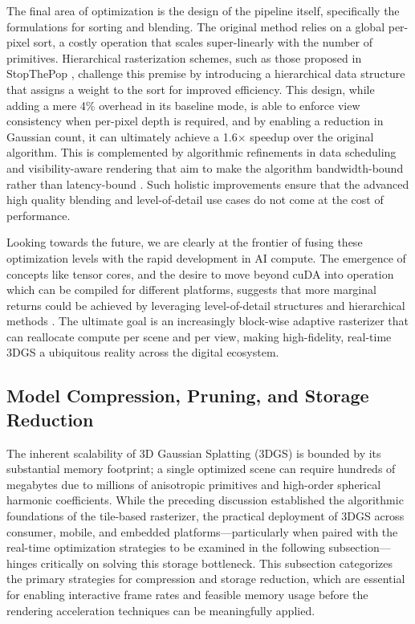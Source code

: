 \documentclass[11pt,a4paper]{article}
\begin{document}
The final area of optimization is the design of the pipeline itself, specifically the formulations for sorting and blending. The original method relies on a global per-pixel sort, a costly operation that scales super-linearly with the number of primitives. Hierarchical rasterization schemes, such as those proposed in StopThePop \cite{arxiv:2402.00525v1}, challenge this premise by introducing a hierarchical data structure that assigns a weight to the sort for improved efficiency. This design, while adding a mere 4\% overhead in its baseline mode, is able to enforce view consistency when per-pixel depth is required, and by enabling a reduction in Gaussian count, it can ultimately achieve a 1.6$\times$ speedup over the original algorithm. This is complemented by algorithmic refinements in data scheduling and visibility-aware rendering that aim to make the algorithm bandwidth-bound rather than latency-bound \cite{arxiv:2308.04079v1}. Such holistic improvements ensure that the advanced high quality blending and level-of-detail use cases do not come at the cost of performance.

Looking towards the future, we are clearly at the frontier of fusing these optimization levels with the rapid development in AI compute. The emergence of concepts like tensor cores, and the desire to move beyond cuDA into operation which can be compiled for different platforms, suggests that more marginal returns could be achieved by leveraging level-of-detail structures and hierarchical methods \cite{arxiv:2406.12080v1}. The ultimate goal is an increasingly block-wise adaptive rasterizer that can reallocate compute per scene and per view, making high-fidelity, real-time 3DGS a ubiquitous reality across the digital ecosystem.


\subsection{Model Compression, Pruning, and Storage Reduction}


The inherent scalability of 3D Gaussian Splatting (3DGS) is bounded by its substantial memory footprint; a single optimized scene can require hundreds of megabytes due to millions of anisotropic primitives and high-order spherical harmonic coefficients. While the preceding discussion established the algorithmic foundations of the tile-based rasterizer, the practical deployment of 3DGS across consumer, mobile, and embedded platforms---particularly when paired with the real-time optimization strategies to be examined in the following subsection---hinges critically on solving this storage bottleneck. This subsection categorizes the primary strategies for compression and storage reduction, which are essential for enabling interactive frame rates and feasible memory usage before the rendering acceleration techniques can be meaningfully applied.
\end{document}
